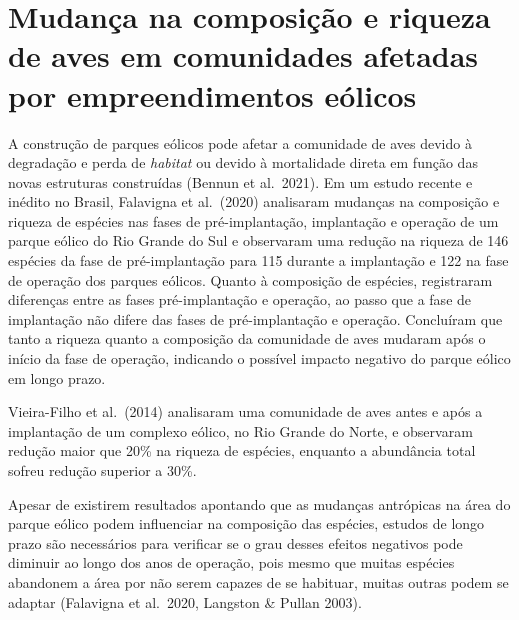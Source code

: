 \documentclass[
  oneside]{scrbook}
\begin{document}
\hypertarget{mudanuxe7a-na-composiuxe7uxe3o-e-riqueza-de-aves-em-comunidades-afetadas-por-empreendimentos-euxf3licos}{%
\section{Mudança na composição e riqueza de aves em comunidades afetadas por empreendimentos eólicos}\label{mudanuxe7a-na-composiuxe7uxe3o-e-riqueza-de-aves-em-comunidades-afetadas-por-empreendimentos-euxf3licos}}

A construção de parques eólicos pode afetar a comunidade de aves devido à degradação e perda de \emph{habitat} ou devido à mortalidade direta em função das novas estruturas construídas (Bennun et al.~2021). Em um estudo recente e inédito no Brasil, Falavigna et al.~(2020) analisaram mudanças na composição e riqueza de espécies nas fases de pré-implantação, implantação e operação de um parque eólico do Rio Grande do Sul e observaram uma redução na riqueza de 146 espécies da fase de pré-implantação para 115 durante a implantação e 122 na fase de operação dos parques eólicos. Quanto à composição de espécies, registraram diferenças entre as fases pré-implantação e operação, ao passo que a fase de implantação não difere das fases de pré-implantação e operação. Concluíram que tanto a riqueza quanto a composição da comunidade de aves mudaram após o início da fase de operação, indicando o possível impacto negativo do parque eólico em longo prazo.

Vieira-Filho et al.~(2014) analisaram uma comunidade de aves antes e após a implantação de um complexo eólico, no Rio Grande do Norte, e observaram redução maior que 20\% na riqueza de espécies, enquanto a abundância total sofreu redução superior a 30\%.

Apesar de existirem resultados apontando que as mudanças antrópicas na área do parque eólico podem influenciar na composição das espécies, estudos de longo prazo são necessários para verificar se o grau desses efeitos negativos pode diminuir ao longo dos anos de operação, pois mesmo que muitas espécies abandonem a área por não serem capazes de se habituar, muitas outras podem se adaptar (Falavigna et al.~2020, Langston \& Pullan 2003).
\end{document}
